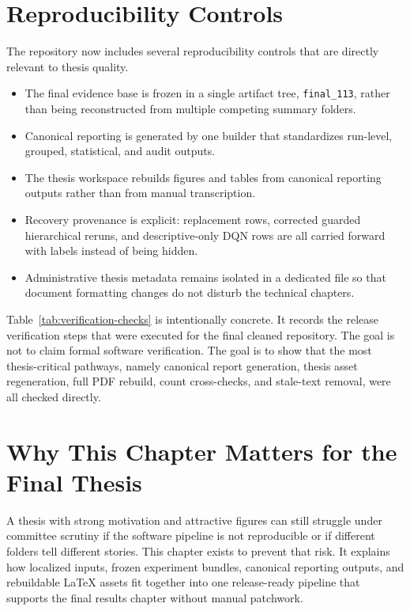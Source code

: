 

\section{Reproducibility Controls}

The repository now includes several reproducibility controls that are directly relevant to thesis quality.
\begin{itemize}[leftmargin=1.2cm]
    \item The final evidence base is frozen in a single artifact tree, \texttt{final\_113}, rather than being reconstructed from multiple competing summary folders.
    \item Canonical reporting is generated by one builder that standardizes run-level, grouped, statistical, and audit outputs.
    \item The thesis workspace rebuilds figures and tables from canonical reporting outputs rather than from manual transcription.
    \item Recovery provenance is explicit: replacement rows, corrected guarded hierarchical reruns, and descriptive-only DQN rows are all carried forward with labels instead of being hidden.
    \item Administrative thesis metadata remains isolated in a dedicated file so that document formatting changes do not disturb the technical chapters.
\end{itemize}



Table~\ref{tab:verification-checks} is intentionally concrete. It records the release verification steps that were executed for the final cleaned repository. The goal is not to claim formal software verification. The goal is to show that the most thesis-critical pathways, namely canonical report generation, thesis asset regeneration, full PDF rebuild, count cross-checks, and stale-text removal, were all checked directly.

\section{Why This Chapter Matters for the Final Thesis}

A thesis with strong motivation and attractive figures can still struggle under committee scrutiny if the software pipeline is not reproducible or if different folders tell different stories. This chapter exists to prevent that risk. It explains how localized inputs, frozen experiment bundles, canonical reporting outputs, and rebuildable LaTeX assets fit together into one release-ready pipeline that supports the final results chapter without manual patchwork.
